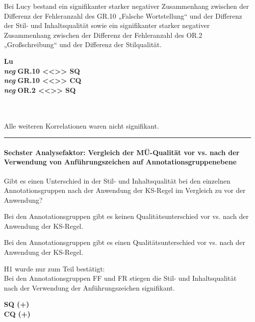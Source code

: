 \medskip
\noindent
\parbox[t]{.7\textwidth}{
Bei Lucy bestand ein signifikanter starker negativer Zusammenhang zwischen der Differenz der Fehleranzahl des GR.10 „Falsche Wortstellung“ und der Differenz der Stil- und Inhaltsqualität sowie ein signifikanter starker negativer Zusammenhang zwischen der Differenz der Fehleranzahl des OR.2 „Großschreibung“ und der Differenz der Stilqualität.
}
\parbox[t]{.04\textwidth}{}
\colorbox{smGreen}{\parbox[t]{.25\textwidth}{
\textbf{Lu}\\
\textbf{\textit{neg}} \textbf{GR.10 <{}<{}>{}> SQ}\\
\textbf{\textit{neg}} \textbf{GR.10 <{}<{}>{}> CQ}\\
\textbf{\textit{neg}} \textbf{OR.2 <{}<{}>{}> SQ}\\
\\
\\
}}

\medskip
\noindent
\parbox[t]{.7\textwidth}{
Alle weiteren Korrelationen waren nicht signifikant.}

\hrule
\paragraph*{Sechster Analysefaktor: Vergleich der MÜ-Qualität vor vs. nach der Verwendung von Anführungszeichen auf Annotationsgruppenebene}
\begin{description}[font=\normalfont\bfseries]
\item [Fragestellung:] Gibt es einen Unterschied in der Stil- und Inhaltsqualität bei den einzelnen Annotationsgruppen nach der Anwendung der KS-Regel im Vergleich zu vor der Anwendung?
\item [H0 --] Bei den Annotationsgruppen gibt es keinen Qualitätsunterschied vor vs. nach der Anwendung der KS-Regel.
\item [H1 --] Bei den Annotationsgruppen gibt es einen Qualitätsunterschied vor vs. nach der Anwendung der KS-Regel.
\item [Resultat]
\end{description}
\noindent
\parbox[t]{.8\textwidth}{
H1 wurde nur zum Teil bestätigt:\\
Bei den Annotationsgruppen FF und FR stiegen die Stil- und Inhaltsqualität nach der Verwendung der Anführungszeichen signifikant.
}
\parbox[t]{.04\textwidth}{}
\colorbox{smGreen}{\parbox[t]{.15\textwidth}{
\textbf{SQ (+)}\\
\textbf{CQ (+)}\\
\\
}}

